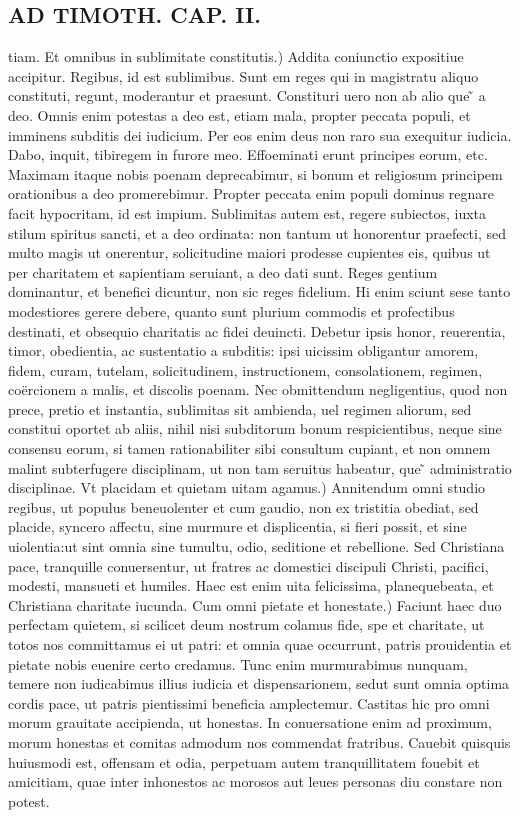 \documentclass{article}
\begin{document}
\begin{pages}
\section*{AD TIMOTH. CAP. II. }
\marginpar{[ p.481 ]}\pstart tiam. Et omnibus in sublimitate constitutis.) Addita coniunctio expositiue accipitur. Regibus, id est sublimibus. Sunt em reges qui in magistratu aliquo constituti, regunt, moderantur et praesunt. Constituri uero non ab alio que ̃ a deo. Omnis enim potestas a deo est, etiam mala, propter peccata populi, et imminens subditis dei iudicium. Per eos enim deus non raro sua exequitur iudicia. Dabo, inquit, tibiregem in furore meo. Effoeminati erunt principes eorum, etc. Maximam itaque  nobis poenam deprecabimur, si bonum et religiosum principem orationibus a deo promerebimur. Propter peccata enim populi dominus regnare facit hypocritam, id est impium. Sublimitas autem est, regere subiectos, iuxta stilum spiritus sancti, et a deo ordinata: non tantum ut honorentur praefecti, sed multo magis ut onerentur, solicitudine maiori prodesse cupientes eis, quibus ut per charitatem et sapientiam seruiant, a deo dati sunt. Reges gentium dominantur, et benefici dicuntur, non sic reges fidelium. Hi enim sciunt sese tanto modestiores gerere debere, quanto sunt plurium commodis et profectibus destinati, et obsequio charitatis ac fidei deuincti. Debetur ipsis honor, reuerentia, timor, obedientia, ac sustentatio a subditis: ipsi uicissim obligantur amorem, fidem, curam, tutelam, solicitudinem, instructionem, consolationem, regimen, coërcionem a malis, et discolis poenam. Nec obmittendum negligentius, quod non prece, pretio et instantia, sublimitas sit ambienda, uel regimen aliorum, sed constitui oportet ab aliis, nihil nisi subditorum bonum respicientibus, neque  sine consensu eorum, si tamen rationabiliter sibi consultum cupiant, et non omnem malint subterfugere disciplinam, ut non tam seruitus habeatur, que ̃ administratio disciplinae. Vt placidam et quietam uitam agamus.) Annitendum omni studio regibus, ut populus beneuolenter et cum gaudio, non ex tristitia obediat, sed placide, syncero affectu, sine murmure et displicentia, si fieri possit, et sine uiolentia:ut sint omnia sine tumultu, odio, seditione et rebellione. Sed Christiana pace, tranquille conuersentur, ut fratres ac domestici discipuli Christi, pacifici, modesti, mansueti et humiles. Haec est enim uita felicissima, planequebeata, et Christiana charitate iucunda. Cum omni pietate et honestate.) Faciunt haec duo perfectam quietem, si scilicet deum nostrum colamus fide, spe et charitate, ut totos nos committamus ei ut patri: et omnia quae occurrunt, patris prouidentia et pietate nobis euenire certo credamus. Tunc enim murmurabimus nunquam, temere non iudicabimus illius iudicia et dispensarionem, sedut sunt omnia optima cordis pace, ut patris pientissimi beneficia amplectemur. Castitas hic pro omni morum grauitate accipienda, ut honestas. In conuersatione enim ad proximum, morum honestas et comitas admodum nos commendat fratribus. Cauebit quisquis huiusmodi est, offensam et odia, perpetuam autem tranquillitatem fouebit et amicitiam, quae inter inhonestos ac morosos aut leues personas diu constare non potest.  \pend

\end{pages}
\end{document}
